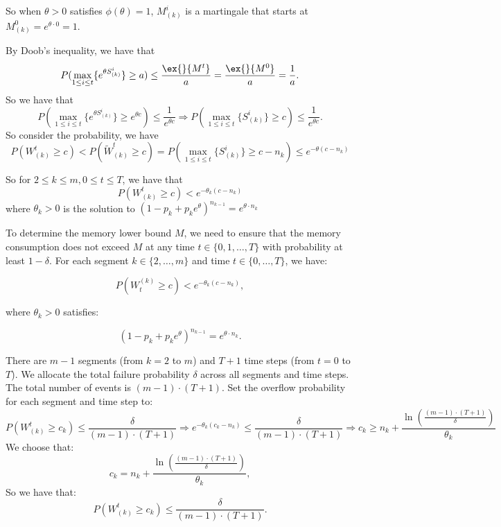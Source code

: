 So when $\theta>0$ satisfies $\phi(\theta)=1$, $M^i_{(k)}$ is a martingale that starts at $M^0_{(k)}= e^{\theta\cdot 0}=1 $.

By Doob's inequality, we have that
$$P(\max_{1\leq i
\leq t}\{ e^{\theta S^i_{(k)}} \}\geq a)\leq \frac{\ex{}{M^t}}{a} = \frac{\ex{}{M^0}}{a}= \frac{1}{a}.$$
So we have that
$$P(\max_{1\leq i
\leq t}\{ e^{\theta S^i_{(k)}}\} \geq e^{\theta c})\leq \frac{1}{e^{\theta c}}  \Rightarrow P(\max_{1\leq i
\leq t}\{  S^i_{(k)}\} \geq c)\leq \frac{1}{e^{\theta c}} .$$
So consider the probability, we have 
$$P\left(  W^t_{(k)}\geq c  \right) <P\left(  \tilde{W}^t_{(k)}\geq c  \right) = P(\max_{1\leq i
\leq t}\{  S^i_{(k)}\} \geq c - n_k)\leq e^{-\theta (c - n_k)}$$

So for $2\leq k\leq m, 0\leq t\leq T$, we have that
$$P\left(  W^t_{(k)}\geq c  \right)< e^{-\theta_k (c - n_k)}$$
where $\theta_k>0$ is the solution to $(1-p_k+p_ke^{\theta})^{n_{k-1}}=e^{\theta \cdot n_k}$

To determine the memory lower bound \( M \), we need to ensure that the memory consumption does not exceed \( M \) at any time \( t \in \{0, 1, \dots, T\} \) with probability at least \( 1 - \delta \). For each segment \( k \in \{2, \dots, m\} \) and time \( t \in \{0, \dots, T\} \), we have: 

\[ P\left( W_t^{(k)} \geq c \right) < e^{-\theta_k (c - n_k)}, \]

where \( \theta_k > 0 \) satisfies:

\[ (1 - p_k + p_k e^{\theta})^{n_{k-1}} = e^{\theta \cdot  n_k}. \]

There are \( m - 1 \) segments (from \( k = 2 \) to \( m \)) and \( T + 1 \) time steps (from \( t = 0 \) to \( T \)). We allocate the total failure probability \( \delta \) across all segments and time steps. The total number of events is \( (m - 1) \cdot (T + 1) \). Set the overflow probability for each segment and time step to:
\[ P\left( W^t_{(k)} \geq c_k \right) \leq \frac{\delta}{(m - 1) \cdot (T + 1)}\Rightarrow e^{-\theta_k (c_k - n_k)} \leq \frac{\delta}{(m - 1) \cdot (T + 1)}\Rightarrow c_k \geq n_k + \frac{\ln\left( \frac{(m - 1) \cdot (T + 1)}{\delta} \right)}{\theta_k} \]
We choose that:
\[ c_k = n_k + \frac{\ln\left( \frac{(m - 1) \cdot (T + 1)}{\delta} \right)}{\theta_k}, \]
So we have that:
\[ P\left( W^t_{(k)} \geq c_k \right) \leq \frac{\delta}{(m - 1) \cdot (T + 1)}. \]


